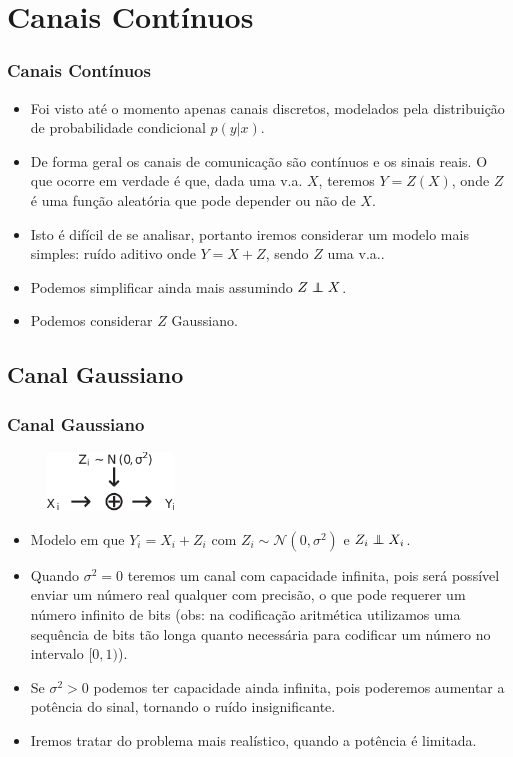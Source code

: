 \section{Canais Contínuos}
\begin{frame}[allowframebreaks]
  \frametitle{Canais Contínuos}
  \begin{itemize}
  \item Foi visto até o momento apenas canais discretos, modelados pela distribuição 
	de probabilidade condicional $p(y|x)$.
  \item De forma geral os canais de comunicação são contínuos e os sinais reais.
	O que ocorre em verdade é que, dada uma v.a. $X$, teremos $Y = Z(X)$,
	onde $Z$ é uma função aleatória que pode depender ou não de $X$.
  \item Isto é difícil de se analisar, portanto iremos considerar um modelo
	mais simples: ruído aditivo onde $Y = X + Z$, sendo $Z$ uma v.a..
  \item Podemos simplificar ainda mais assumindo $Z \independent X$.
  \item Podemos considerar $Z$ Gaussiano.
  \end{itemize}
\end{frame}


\subsection{Canal Gaussiano}
\begin{frame}[allowframebreaks]
  \frametitle{Canal Gaussiano}

  \begin{figure}[h!]
  \centering
  \includegraphics[width=0.3\textwidth]{images/channeladdnoisemodel.pdf}
  \label{fig:channeladdnoisemodel}
  \end{figure}

  \begin{itemize}
  \item Modelo em que $Y_i = X_i + Z_i$ com $Z_i \sim \mathcal{N} (0, \sigma^2)$ e $Z_i \independent X_i$.
  \item Quando $\sigma^2=0$ teremos um canal com capacidade infinita, pois será possível enviar um número
	real qualquer com precisão, o que pode requerer um número infinito de bits (obs: na codificação aritmética
	utilizamos uma sequência de bits tão longa quanto necessária para codificar um número no intervalo $[0,1)$).
  \item Se $\sigma^2 > 0$ podemos ter capacidade ainda infinita, pois poderemos aumentar a potência do sinal, tornando
	o ruído insignificante.
  \item Iremos tratar do problema mais realístico, quando a potência é limitada.
  \end{itemize}
\end{frame}


